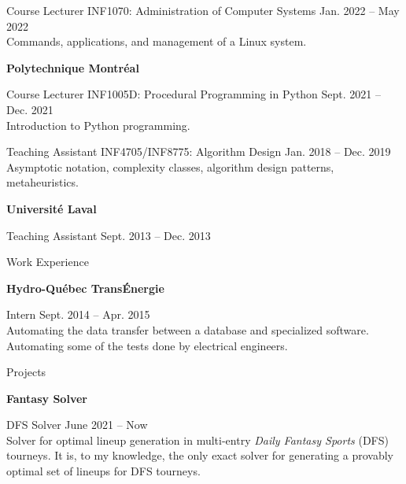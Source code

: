 \documentclass[letterpaper,MMMyyyy,nonstopmode]{simpleresumecv}
\begin{document}
\begin{Body}
Course Lecturer
\BulletItem
INF1070: Administration of Computer Systems
\hfill
Jan. 2022 -- May 2022
\small \\ Commands, applications, and management of a Linux system. \normalsize

\Gap\Gap
\Entry
\textbf{Polytechnique Montréal}

Course Lecturer
\BulletItem
INF1005D: Procedural Programming in Python
\hfill
Sept. 2021 -- Dec. 2021
\small \\ Introduction to Python programming. \normalsize

\Gap\Gap
Teaching Assistant
\BulletItem
INF4705/INF8775: Algorithm Design
\hfill
Jan. 2018 -- Dec. 2019
\small \\ Asymptotic notation, complexity classes, algorithm design patterns, metaheuristics. \normalsize

\pagebreak %

\Gap\Gap
\Entry
\textbf{Université Laval}

\Gap\Gap
Teaching Assistant
\hfill Sept. 2013 -- Dec. 2013


\Section
{Work \quad\quad Experience}{}{}

\Entry
\textbf{Hydro-Québec TransÉnergie}

Intern
\hfill
Sept. 2014 -- Apr. 2015
\small \\ Automating the data transfer between a database and specialized software. Automating some of the tests done by electrical engineers.\normalsize


\Section
{Projects}{}{}

\Entry
\textbf{Fantasy Solver}

DFS Solver
\hfill
June 2021 -- Now
\small \\ Solver for optimal lineup generation in multi-entry \emph{Daily Fantasy Sports} (DFS) tourneys. It is, to my knowledge, the only exact solver for generating a provably optimal set of lineups for DFS tourneys.\normalsize










\end{Body}
\end{document}
